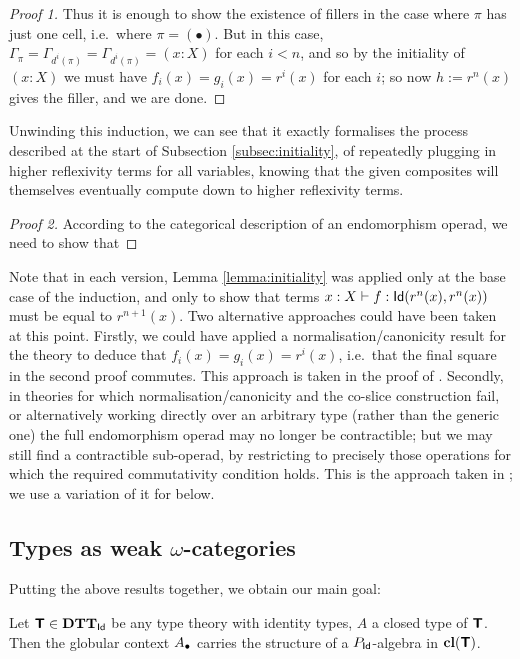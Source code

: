 \begin{proof}[Proof 1]
Thus it is enough to show the existence of fillers in the case where $\pi$ has just one cell, i.e.\ where $\pi = ( \bullet )$.  But in this case, $\Gamma_\pi = \Gamma_{d^i(\pi)} = \Gamma_{d^i(\pi)} = (x:X)$ for each $i < n$, and so by the initiality of $(x:X)$ we must have $f_i(x) = g_i(x) = r^i(x)$ for each $i$; so now $h := r^n(x)$ gives the filler, and we are done.
\end{proof}

Unwinding this induction, we can see that it exactly formalises the process described at the start of Subsection \ref{subsec:initiality}, of repeatedly plugging in higher reflexivity terms for all variables, knowing that the given composites will themselves eventually compute down to higher reflexivity terms.

\begin{proof}[Proof 2]
According to the categorical description of an endomorphism operad, we need to show that 
\end{proof}

Note that in each version, Lemma \ref{lemma:initiality} was applied only at the base case of the induction, and only to show that terms $x:X \vdash f: \mathsf{Id}(r^n(x),r^n(x))$ must be equal to $r^{n+1}(x)$.  Two alternative approaches could have been taken at this point.  Firstly, we could have applied a normalisation/canonicity result for the theory to deduce that $f_i(x) = g_i(x) = r^i(x)$, i.e.\ that the final square in the second proof commutes. This approach is taken in the proof of \label{thm:ctrble-operad-for-id}.  Secondly, in theories for which normalisation/canonicity and the co-slice construction fail, or alternatively working directly over an arbitrary type (rather than the generic one) the full endomorphism operad may no longer be contractible; but we may still find a contractible sub-operad, by restricting to precisely those operations for which the required commutativity condition holds.  This is the approach taken in \cite{garner-van-den-berg}; we use a variation of it for \label{thm:ctrble-operad-for-piidelim} below.

\subsection{Types as weak \texorpdfstring{$\omega$}{omega}-categories} \label{subsec:payoff}

Putting the above results together, we obtain our main goal:

\begin{theorem}Let $\textbf{\textsf{T}} \in \mathbf{DTT}_{\mathsf{Id}}$ be any type theory with identity types, $A$ a closed type of $\textbf{\textsf{T}}$.  Then the globular context $A_\bullet$ carries the structure of a $P_{\mathsf{Id}}$-algebra in $\mathbf{cl}(\textbf{\textsf{T}})$.
\end{theorem}

